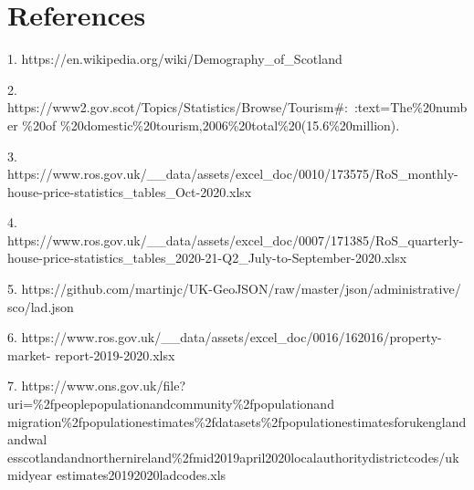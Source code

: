 \documentclass{homeworg}
\begin{document}
\section{References}
1. https://en.wikipedia.org/wiki/Demography\_of\_Scotland \par
2. https://www2.gov.scot/Topics/Statistics/Browse/Tourism\#:~:text=The\%20number \%20of \%20domestic\%20tourism,2006\%20total\%20(15.6\%20million). \par
3. https://www.ros.gov.uk/\_\_data/assets/excel\_doc/0010/173575/RoS\_monthly- house-price-statistics\_tables\_Oct-2020.xlsx \par
4. https://www.ros.gov.uk/\_\_data/assets/excel\_doc/0007/171385/RoS\_quarterly- house-price-statistics\_tables\_2020-21-Q2\_July-to-September-2020.xlsx \par
5. https://github.com/martinjc/UK-GeoJSON/raw/master/json/administrative/ sco/lad.json \par
6. https://www.ros.gov.uk/\_\_data/assets/excel\_doc/0016/162016/property-market- report-2019-2020.xlsx \par
7. https://www.ons.gov.uk/file?uri=\%2fpeoplepopulationandcommunity\%2fpopulationand migration\%2fpopulationestimates\%2fdatasets\%2fpopulationestimatesforukenglandandwal esscotlandandnorthernireland\%2fmid2019april2020localauthoritydistrictcodes/ukmidyear estimates20192020ladcodes.xls \par
\end{document}

